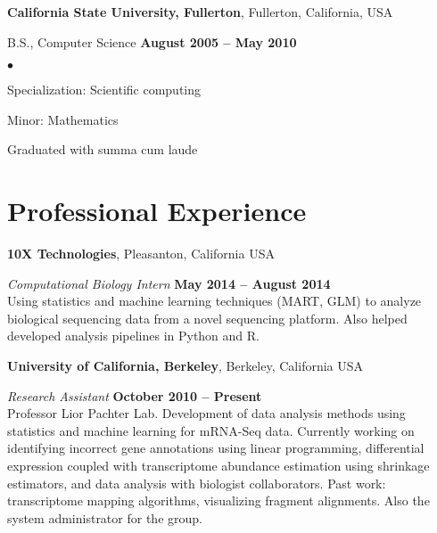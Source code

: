 \documentclass[margin,line]{res}
\newenvironment{list2}{
  \begin{list}{$\bullet$}{%
      \setlength{\itemsep}{0in}
      \setlength{\parsep}{0in} \setlength{\parskip}{0in}
      \setlength{\topsep}{0in} \setlength{\partopsep}{0in}
      \setlength{\leftmargin}{0.2in}}}{\end{list}}
\begin{document}
\begin{resume}
{\bf California State University, Fullerton}, Fullerton, California, USA

\vspace{-.3cm}
B.S., Computer Science \hfill {\bf August 2005 -- May 2010}\\
\vspace{-.45cm}
\begin{list2}
\vspace*{1mm}
\item Specialization: Scientific computing
\item Minor: Mathematics
\item Graduated with summa cum laude
\end{list2}


\section{\sc Professional Experience}

{\bf 10X Technologies}, Pleasanton, California USA
\vspace{-.3cm}

{\em Computational Biology Intern} \hfill {\bf May 2014 -- August 2014}\\
Using statistics and machine learning techniques (MART, GLM) to analyze
biological sequencing data from a novel sequencing platform. Also helped
developed analysis pipelines in Python and R.

{\bf University of California, Berkeley}, Berkeley, California USA
\vspace{-.3cm}

{\em Research Assistant} \hfill {\bf October 2010 -- Present}\\
Professor Lior Pachter Lab. Development of data analysis methods using
statistics and machine learning for mRNA-Seq data. Currently working on
identifying incorrect gene annotations using linear programming, differential
expression coupled with transcriptome abundance estimation using shrinkage
estimators, and data analysis with biologist collaborators. Past work:
transcriptome mapping algorithms, visualizing fragment alignments. Also the
system administrator for the group.


\end{resume}
\end{document}
